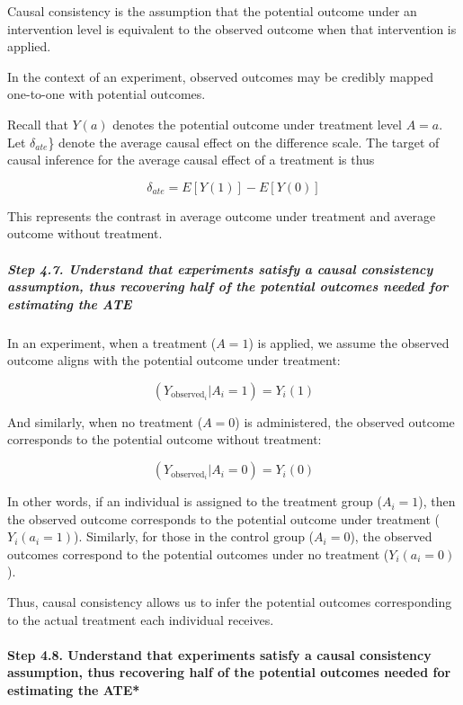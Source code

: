 \documentclass[
  singlecolumn]{article}
\let\oldparagraph\paragraph
\renewcommand{\paragraph}[1]{\oldparagraph{#1}\mbox{}}
\let\oldsubparagraph\subparagraph
\renewcommand{\subparagraph}[1]{\oldsubparagraph{#1}\mbox{}}
\begin{document}
Causal consistency is the assumption that the potential outcome under an
intervention level is equivalent to the observed outcome when that
intervention is applied.

In the context of an experiment, observed outcomes may be credibly
mapped one-to-one with potential outcomes.

Recall that \(Y(a)\) denotes the potential outcome under treatment level
\(A = a\). Let \(\delta_{ate}\)\} denote the average causal effect on
the difference scale. The target of causal inference for the average
causal effect of a treatment is thus

\[
\delta_{ate} = E[Y(1)] - E[Y(0)]
\]

This represents the contrast in average outcome under treatment and
average outcome without treatment.

\subparagraph{\texorpdfstring{\textbf{Step 4.7. Understand that
experiments satisfy a causal consistency assumption, thus recovering
half of the potential outcomes needed for estimating the
ATE}}{Step 4.7. Understand that experiments satisfy a causal consistency assumption, thus recovering half of the potential outcomes needed for estimating the ATE}}\label{step-4.7.-understand-that-experiments-satisfy-a-causal-consistency-assumption-thus-recovering-half-of-the-potential-outcomes-needed-for-estimating-the-ate}

In an experiment, when a treatment (\(A = 1\)) is applied, we assume the
observed outcome aligns with the potential outcome under treatment:

\[
(Y_{\text{observed}_i}|A_i = 1) = Y_i(1)
\]

And similarly, when no treatment (\(A = 0\)) is administered, the
observed outcome corresponds to the potential outcome without treatment:

\[
(Y_{\text{observed}_i}|A_i = 0) = Y_i(0)
\]

In other words, if an individual is assigned to the treatment group
(\(A_i = 1\)), then the observed outcome corresponds to the potential
outcome under treatment (\(Y_i(a_i = 1)\)). Similarly, for those in the
control group (\(A_i = 0\)), the observed outcomes correspond to the
potential outcomes under no treatment (\(Y_i(a_i = 0)\)).

Thus, causal consistency allows us to infer the potential outcomes
corresponding to the actual treatment each individual receives.

\paragraph{\texorpdfstring{\textbf{Step 4.8. Understand that experiments
satisfy a causal consistency assumption, thus recovering half of the
potential outcomes needed for estimating the
ATE}*}{Step 4.8. Understand that experiments satisfy a causal consistency assumption, thus recovering half of the potential outcomes needed for estimating the ATE*}}\label{step-4.8.-understand-that-experiments-satisfy-a-causal-consistency-assumption-thus-recovering-half-of-the-potential-outcomes-needed-for-estimating-the-ate}
\end{document}
